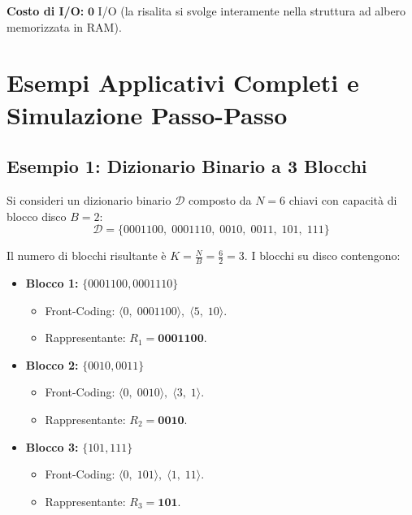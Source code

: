 \textbf{Costo di I/O:} $\mathbf{0}$ I/O (la risalita si svolge interamente nella struttura ad albero memorizzata in RAM).


\FloatBarrier
\section{Esempi Applicativi Completi e Simulazione Passo-Passo}
\label{sec:esempi-simulazione-blind-trie}

\FloatBarrier
\subsection{Esempio 1: Dizionario Binario a 3 Blocchi}
\label{subsec:esempio-binario-3-blocchi}

Si consideri un dizionario binario $\mathcal{D}$ composto da $N = 6$ chiavi con capacit\`a di blocco disco $B = 2$:
\begin{equation}
  \mathcal{D} = \{0001100, \; 0001110, \; 0010, \; 0011, \; 101, \; 111\}
\end{equation}

Il numero di blocchi risultante \`e $K = \frac{N}{B} = \frac{6}{2} = 3$. I blocchi su disco contengono:
\begin{itemize}
  \item \textbf{Blocco 1:} $\{0001100, 0001110\}$
  \begin{itemize}
    \item Front-Coding: $\langle 0, \; 0001100 \rangle, \; \langle 5, \; 10 \rangle$.
    \item Rappresentante: $R_1 = \mathbf{0001100}$.
  \end{itemize}
  \item \textbf{Blocco 2:} $\{0010, 0011\}$
  \begin{itemize}
    \item Front-Coding: $\langle 0, \; 0010 \rangle, \; \langle 3, \; 1 \rangle$.
    \item Rappresentante: $R_2 = \mathbf{0010}$.
  \end{itemize}
  \item \textbf{Blocco 3:} $\{101, 111\}$
  \begin{itemize}
    \item Front-Coding: $\langle 0, \; 101 \rangle, \; \langle 1, \; 11 \rangle$.
    \item Rappresentante: $R_3 = \mathbf{101}$.
  \end{itemize}
\end{itemize}


